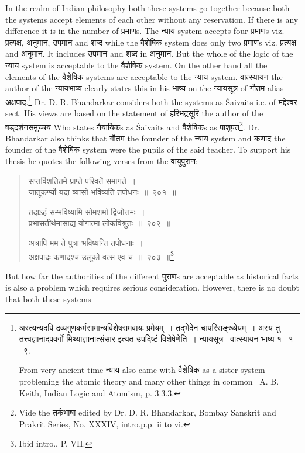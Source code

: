 \documentclass[11pt, openany]{book}
\begin{document}
In the realm of Indian philosophy both these systems go together because both the systems accept elements of each other without any reservation. If there is any difference it is in the number of प्रमाणs. The न्याय system accepts four प्रमाणs viz. प्रत्यक्ष, अनुमान, उपमान and शब्द while the वैशेषिक system does only two प्रमाणs viz. प्रत्यक्ष and अनुमान. It includes उपमान and शब्द in अनुमान. But the whole of the logic of the न्याय system is acceptable to the वैशेषिक system. On the other hand all the elements of the वैशेषिक systems are acceptable to the न्याय system. वात्स्यायन the author of the न्यायभाष्य clearly states this in his भाष्य on the न्यायसूत्र of गौतम alias अक्षपाद.\renewcommand{\thefootnote}{1}\footnote{अस्त्यन्यदपि द्रव्यगुणकर्मसामान्यविशेषसमवायः प्रमेयम्~। तद्भेदेन चापरिसङ्ख्येयम्~। अस्य तु तत्त्वज्ञानादपवर्गो मिथ्याज्ञानात्संसार इत्यत उपदिष्टं विशेषेणेति~। न्यायसूत्र \textendash\ वात्स्यायन भाष्य १ \textendash\ १ \textendash\ ९.

From very ancient time न्याय also came with वैशेषिक as a sister system probleming the atomic theory and many other things in common  \textendash\ A. B. Keith, Indian Logic and Atomism, p. 3.3.3.} Dr. D. R. Bhandarkar considers both the systems as Śaivaits i.e. of मद्देश्वर sect. His views are based on the statement of हरिभद्रसूरि the author of the षड्दर्शनसमुच्चय Who states नैयायिकs as Śaivaits and वैशेषिकs as पाशुपत\renewcommand{\thefootnote}{2}\footnote{Vide the तर्कभाषा edited by Dr. D. R. Bhandarkar, Bombay Sanskrit and Prakrit Series, No. XXXIV, intro.p.p. ii to vi.}. Dr. Bhandarkar also thinks that गौतम the founder of the न्याय system and कणाद the founder of the वैशेषिक system were the pupils of the said teacher. To support his thesis he quotes the following verses from the वायुपुराण:\textendash\

\begin{quote}
{\knui सप्तविंशतितमे प्राप्ते परिवर्ते समागते~।\\
जातूकर्ण्यो यदा व्यासो भविष्यति तपोधनः~॥~२०१~॥

तदाऽहं सम्भविष्यामि सोमशर्मा द्विजोत्तमः~।\\
प्रभासतीर्थमासाद्य योगात्मा लोकविश्रुतः~॥~२०२~॥

अत्रापि मम ते पुत्रा भविष्यन्ति तपोधनाः~।\\
अक्षपादः कणादश्च उलूको वत्स एव च~॥~२०३~॥\renewcommand{\thefootnote}{3}\footnote{Ibid intro., P. VII.}}
\end{quote}

\noindent
But how far the authorities of the different पुराणs are acceptable as historical facts is also a problem which requires serious consideration. However, there is no doubt that both these systems
\end{document}
